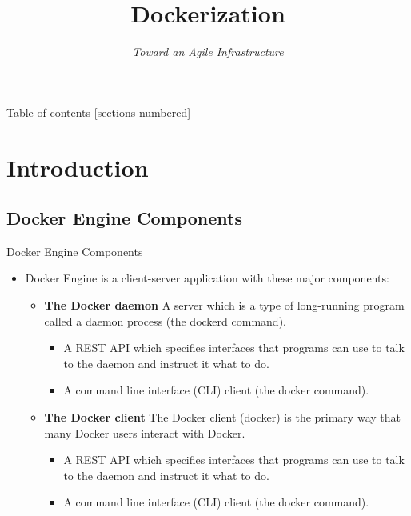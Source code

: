 \documentclass[aspectratio=169]{beamer}
\title[Dockerization]{Dockerization}
\subtitle{\textit{Toward an Agile Infrastructure}}
\begin{document}
    \maketitle

    \begin{frame}{Table of contents}
        [sections numbered]
        \tableofcontents[hideallsubsections]
    \end{frame}



    \section{Introduction}\label{sec:introduction}

    \subsection{Docker Engine Components}\label{subsec:docker-engine-components}
    \begin{frame}{Docker Engine Components}
        \begin{itemize}[<+- | alert@+>]
            \item Docker Engine is a client-server application with these major components:
            \begin{itemize}
                \item \textbf{The Docker daemon} A server which is a type of long-running program called a daemon process (the dockerd command).
                \begin{itemize}
                    \item A REST API which specifies interfaces that programs can use to talk to the daemon and instruct it what to do.
                    \item A command line interface (CLI) client (the docker command).
                \end{itemize}
                \item \textbf{The Docker client} The Docker client (docker) is the primary way that many Docker users interact with Docker.
                \begin{itemize}
                    \item A REST API which specifies interfaces that programs can use to talk to the daemon and instruct it what to do.
                    \item A command line interface (CLI) client (the docker command).
                \end{itemize}
            \end{itemize}
        \end{itemize}
    \end{frame}
\end{document}
